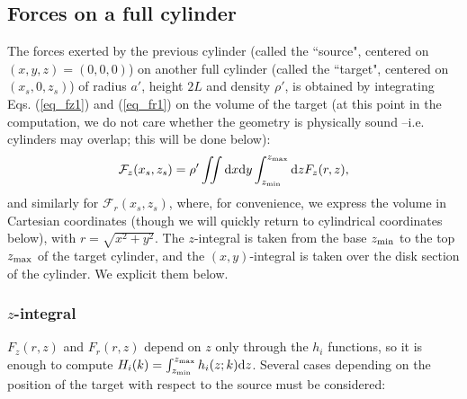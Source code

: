 \documentclass[12pt]{iopart}
\begin{document}
\subsection{Forces on a full cylinder}

The forces exerted by the previous cylinder (called the ``source", centered on $(x,y,z)=(0,0,0)$) on another full cylinder (called the ``target", centered on $(x_s, 0, z_s)$) of radius $a'$, height $2L$ and density $\rho'$, is obtained by integrating Eqs. (\ref{eq_fz1}) and (\ref{eq_fr1}) on the volume of the target (at this point in the computation, we do not care whether the geometry is physically sound --i.e. cylinders may overlap; this will be done below):
\begin{equation} \label{eq_Fzg}
{\mathcal F_z}(x_s, z_s) = \rho' \iint {\rm d}x {\rm d}y \int_{z_{\rm min}}^{z_{\rm max}} {\rm d}z F_z(r,z),
\end{equation}
and similarly for ${\mathcal F_r}(x_s, z_s)$, where, for convenience, we express the volume in Cartesian coordinates (though we will quickly return to cylindrical coordinates below), with $r = \sqrt{x^2 + y^2}$. The $z$-integral is taken from the base $z_{\rm min}$ to the top $z_{\rm max}$ of the target cylinder, and the $(x,y)$-integral is taken over the disk section of the cylinder. We explicit them below.

\subsubsection{$z$-integral} \label{ssect_appzint}

$F_z(r,z)$ and $F_r(r,z)$ depend on $z$ only through the $h_i$ functions, so it is enough to compute $H_i(k) = \int_{z_{\rm min}}^{z_{\rm max}} h_i(z;k) {\rm d}z$. Several cases depending on the position of the target with respect to the source must be considered:
\end{document}
